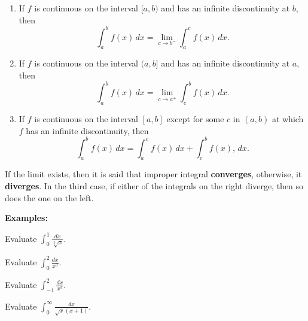 \documentclass[addpoints, 12pt]{exam}
\begin{document}
\begin{tcolorbox}[title= DEFINITION OF IMPROPER INTEGRALS WITH INFINITE DISCONTINUITIES,colframe=black,sharp corners,colback=white,colbacktitle=white,coltitle=black]

    \begin{enumerate}
        \item If $f$ is continuous on the interval $[a,b)$ and has an infinite discontinuity at $b$, then 
        \[\int_a^b f(x)\,dx=\lim_{c\to b^-}\int_a^c f(x)\,dx.\]
        \item If $f$ is continuous on the interval $(a,b]$ and has an infinite discontinuity at $a$, then 
        \[\int_a^b f(x)\,dx=\lim_{c\to a^+}\int_c^b f(x)\,dx.\]
        \item If $f$ is continuous on the interval $[a,b]$ except for some $c$ in $(a,b)$ at which $f$ has an infinite discontinuity, then 
        \[\int_a^b f(x)\,dx=\int_{a}^c f(x)\,dx + \int_c^{b} f(x),\,dx.\]
    \end{enumerate}
    
    If the limit exists, then it is said that improper integral \textbf{converges}, otherwise, it \textbf{diverges}. In the third case, if either of the integrals on the right diverge, then so does the one on the left.

\end{tcolorbox}


\textbf{Examples:}
\begin{questions}
    \begin{minipage}{.45\linewidth}
        \question Evaluate $\displaystyle\int_0^1\frac{dx}{\sqrt[3]{x}}$.    
    \end{minipage}
    \hfill
    \begin{minipage}{.45\linewidth}
        \question Evaluate $\displaystyle\int_0^2\frac{dx}{x^3}$.
    \end{minipage}
    
    
    \newpage
    
    \question Evaluate $\displaystyle\int_{-1}^2\frac{dx}{x^3}$.
    
    
    
    
    \question Evaluate $\displaystyle\int_0^\infty\frac{dx}{\sqrt{x}(x+1)}.$
    
\end{questions}
\end{document}
